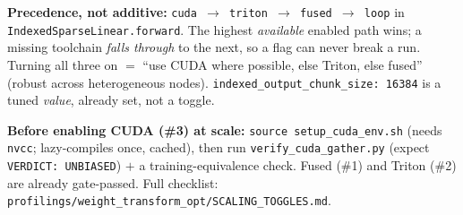\documentclass[11pt]{article}
\begin{document}
\noindent \textbf{Precedence, not additive:} \texttt{cuda $\to$ triton $\to$ fused $\to$ loop} in
\texttt{IndexedSparseLinear.forward}. The highest \emph{available} enabled path wins; a missing
toolchain \emph{falls through} to the next, so a flag can never break a run. Turning all three on
$=$ ``use CUDA where possible, else Triton, else fused'' (robust across heterogeneous nodes).
\texttt{indexed\_output\_chunk\_size: 16384} is a tuned \emph{value}, already set, not a toggle.

\noindent \textbf{Before enabling CUDA (\#3) at scale:} \texttt{source setup\_cuda\_env.sh} (needs
\texttt{nvcc}; lazy-compiles once, cached), then run \texttt{verify\_cuda\_gather.py} (expect
\texttt{VERDICT: UNBIASED}) $+$ a training-equivalence check. Fused (\#1) and Triton (\#2) are
already gate-passed. Full checklist: \texttt{profilings/weight\_transform\_opt/SCALING\_TOGGLES.md}.
\end{document}
